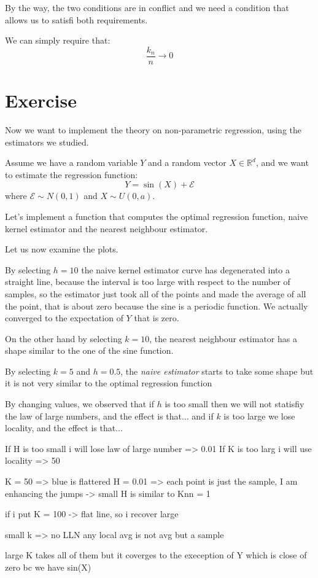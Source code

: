 By the way, the two conditions are in conflict and we need a condition that allows us to satisfi both requirements. 

We can simply require that:
\[
    \frac{k_n}{n} \to 0
\]
\section{Exercise}
Now we want to implement the theory on non-parametric regression, using the estimators we studied.

Assume we have a random variable $Y$ and a random vector $X \in \mathbb{R}^d$, and we want to estimate the regression function:
\[
    Y = \sin(X) + \mathcal{E}
\]
where $\mathcal{E} \sim N(0,1)$ and $X \sim U(0,a)$.

Let's implement a function that computes the optimal regression function, naive kernel estimator and the nearest neighbour estimator.

Let us now examine the plots.

By selecting $h = 10$ the naive kernel estimator curve has degenerated into a straight line, because the interval is too large with respect to the number of samples, so the estimator just took all of the points and made the average of all the point, that is about zero because the sine is a periodic function. We actually converged to the expectation of $Y$ that is zero.

On the other hand by selecting $k=10$, the nearest neighbour estimator has a shape similar to the one of the sine function.

By selecting $k = 5$ and $h=0.5$, the \textit{naive estimator} starts to take some shape but it is not very similar to the optimal regression function

By changing values, we observed that if $h$ is too small then we will not statisfiy the law of large numbers, and the effect is that...
and if $k$ is too large we lose locality, and the effect is that...

If H is too small i will lose law of large number => 0.01
If K is too larg i will use locality => 50

K = 50 => blue is flattered
H = 0.01 => each point is just the sample, I am enhancing the jumps
-> small H is similar to Knn = 1

if i put K = 100 -> flat line, so i recover large

small k => no LLN
any local avg is not avg but a sample

large K takes all of them but it coverges to the exeception of Y which is close of zero bc we have sin(X)

